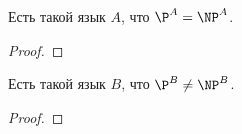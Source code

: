 	\begin{theorem}
		Есть такой язык $A$, что $\P^A = \NP^A$.
	\end{theorem}
	\begin{proof}
		\TODO
	\end{proof}

	\begin{theorem}
		Есть такой язык $B$, что $\P^B \neq \NP^B$.
	\end{theorem}
	\begin{proof}
		\TODO
	\end{proof}
